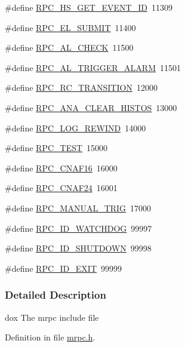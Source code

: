 \begin{DoxyCompactItemize}
\item 
\#define \hyperlink{group__mrpcdefineh_ga4f8ad9ec49e28393516bd2c909463c6c}{RPC\_\-HS\_\-GET\_\-EVENT\_\-ID}~11309
\item 
\#define \hyperlink{group__mrpcdefineh_ga01e8cb480d2e147d0df7075f7c16fd43}{RPC\_\-EL\_\-SUBMIT}~11400
\item 
\#define \hyperlink{group__mrpcdefineh_gaf06b2b267be4f2a46a0e5d6ba5c9be55}{RPC\_\-AL\_\-CHECK}~11500
\item 
\#define \hyperlink{group__mrpcdefineh_ga7010d8066162ac5b7dc3491ff46f45e0}{RPC\_\-AL\_\-TRIGGER\_\-ALARM}~11501
\item 
\#define \hyperlink{group__mrpcdefineh_ga48951274da337133b5244b6e2814e5b8}{RPC\_\-RC\_\-TRANSITION}~12000
\item 
\#define \hyperlink{group__mrpcdefineh_gab04cd68bb2484fcbaa62d2eda3100250}{RPC\_\-ANA\_\-CLEAR\_\-HISTOS}~13000
\item 
\#define \hyperlink{group__mrpcdefineh_gaaeb6f7b0868c6c7cf033e4da7c3ebf2d}{RPC\_\-LOG\_\-REWIND}~14000
\item 
\#define \hyperlink{group__mrpcdefineh_gafa20e13515da863309de89b69c843ad3}{RPC\_\-TEST}~15000
\item 
\#define \hyperlink{group__mrpcdefineh_ga04139d1c129e9a87093587d16d8ac5a4}{RPC\_\-CNAF16}~16000
\item 
\#define \hyperlink{group__mrpcdefineh_gaf48c6e230ebd543627002769684a3240}{RPC\_\-CNAF24}~16001
\item 
\#define \hyperlink{group__mrpcdefineh_gaf820c7d84c71a1469983d23ebec18a8f}{RPC\_\-MANUAL\_\-TRIG}~17000
\item 
\#define \hyperlink{group__mrpcdefineh_ga3871ac0ea0fbdba943cb70c7cfad6780}{RPC\_\-ID\_\-WATCHDOG}~99997
\item 
\#define \hyperlink{group__mrpcdefineh_ga758695700ff26f404eec79ecbeab4947}{RPC\_\-ID\_\-SHUTDOWN}~99998
\item 
\#define \hyperlink{group__mrpcdefineh_ga4fecef60778fda08ca026eaad345eca2}{RPC\_\-ID\_\-EXIT}~99999
\end{DoxyCompactItemize}


\subsubsection{Detailed Description}
dox The mrpc include file 

Definition in file \hyperlink{mrpc_8h_source}{mrpc.h}.